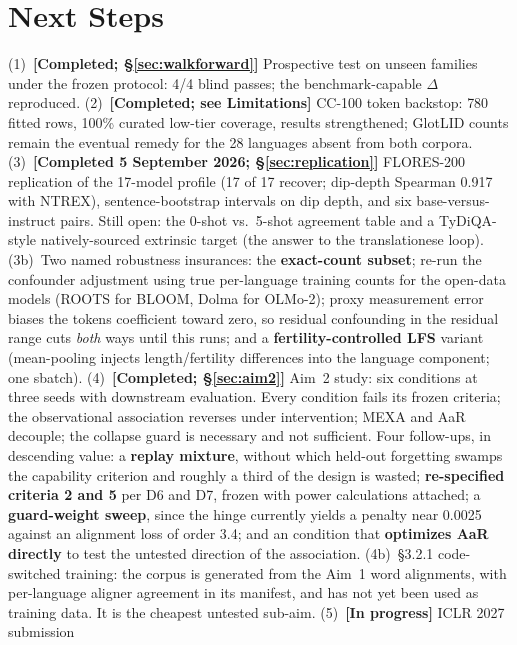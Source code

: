 \documentclass[11pt,a4paper]{article}
\begin{document}
\section{Next Steps}
\label{sec:next}
(1)~\textbf{[Completed; \S\ref{sec:walkforward}]} Prospective test on unseen
families under the frozen protocol: 4/4 blind passes; the benchmark-capable
$\Delta$ reproduced.
(2)~\textbf{[Completed; see Limitations]} CC-100 token backstop: 780
fitted rows, 100\% curated low-tier coverage, results strengthened;
GlotLID counts remain the eventual remedy for the 28 languages absent from
both corpora.
(3)~\textbf{[Completed 5 September 2026; \S\ref{sec:replication}]}
FLORES-200 replication of the 17-model profile (17 of 17 recover; dip-depth
Spearman 0.917 with NTREX), sentence-bootstrap intervals on dip depth, and
six base-versus-instruct pairs. Still open: the 0-shot vs.\ 5-shot agreement
table and a TyDiQA-style natively-sourced extrinsic target (the answer to
the translationese loop).
(3b)~Two named robustness insurances: the \textbf{exact-count subset}; re-run the confounder adjustment using true per-language training counts for the
open-data models (ROOTS for BLOOM, Dolma for OLMo-2); proxy measurement
error biases the tokens coefficient toward zero, so residual confounding in
the residual range cuts \emph{both} ways until this runs; and a
\textbf{fertility-controlled LFS} variant (mean-pooling injects
length/fertility differences into the language component; one sbatch). (4)~\textbf{[Completed; \S\ref{sec:aim2}]} Aim~2 study: six conditions at three
seeds with downstream evaluation. Every condition fails its frozen criteria; the
observational association reverses under intervention; MEXA and AaR decouple;
the collapse guard is necessary and not sufficient. Four follow-ups, in
descending value: a \textbf{replay mixture}, without which held-out
forgetting swamps the capability criterion and roughly a third of the design
is wasted; \textbf{re-specified criteria 2 and 5} per D6 and D7, frozen with
power calculations attached; a \textbf{guard-weight sweep}, since the hinge
currently yields a penalty near 0.0025 against an alignment loss of order
3.4; and an condition that \textbf{optimizes AaR directly} to test the untested
direction of the association.
(4b)~\S3.2.1 code-switched training: the corpus is generated from the Aim~1
word alignments, with per-language aligner agreement in its manifest, and has
not yet been used as training data. It is the cheapest untested sub-aim.
(5)~\textbf{[In progress]} ICLR 2027 submission
\end{document}
